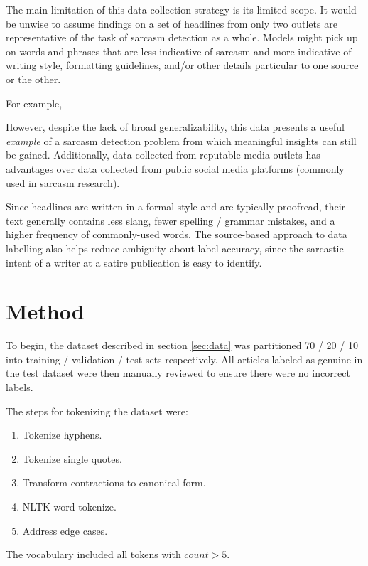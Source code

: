 \documentclass[11pt]{article}
\begin{document}
The main limitation of this data collection strategy is its limited scope. It
would be unwise to assume findings on a set of headlines from only two outlets
are representative of the task of sarcasm detection as a whole. Models might
pick up on words and phrases that are less indicative of sarcasm and more
indicative of writing style, formatting guidelines, and/or other details
particular to one source or the other.

For example, 


However, despite the lack of broad generalizability, this data presents a
useful \textit{example} of a sarcasm detection problem from which meaningful
insights can still be gained. Additionally, data collected from reputable media
outlets has advantages over data collected from public social media platforms
(commonly used in sarcasm research).

Since headlines are written in a formal style and are typically proofread,
their text generally contains less slang, fewer spelling / grammar mistakes,
and a higher frequency of commonly-used words. The source-based approach to
data labelling also helps reduce ambiguity about label accuracy, since the
sarcastic intent of a writer at a satire publication is easy to identify.




\section{Method}

To begin, the dataset described in section \ref{sec:data} was partitioned 70 /
20 / 10 into training / validation / test sets respectively. All articles
labeled as genuine in the test dataset were then manually reviewed to ensure
there were no incorrect labels.

The steps for tokenizing the dataset were:
\begin{enumerate}
    \item Tokenize hyphens.
    \item Tokenize single quotes.
    \item Transform contractions to canonical form.
    \item NLTK word tokenize.
    \item Address edge cases.
\end{enumerate}
The vocabulary included all tokens with $ count > 5 $.
\end{document}
